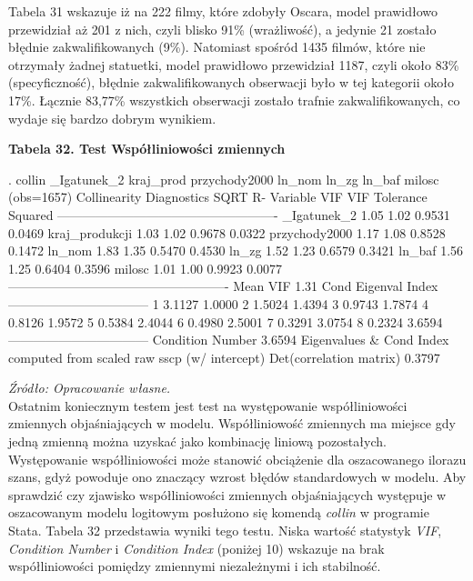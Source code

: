 Tabela 31 wskazuje iż na 222 filmy, które zdobyły Oscara, model prawidłowo przewidział aż 201 z nich, czyli blisko 91\% (wrażliwość), a jedynie 21 zostało błędnie zakwalifikowanych (9\%). Natomiast spośród 1435 filmów, które nie otrzymały żadnej statuetki, model prawidłowo przewidział 1187, czyli około 83\% (specyficzność), błędnie zakwalifikowanych obserwacji było w tej kategorii około 17\%. Łącznie 83,77\% wszystkich obserwacji zostało trafnie zakwalifikowanych, co wydaje się bardzo dobrym wynikiem. 

\vspace{0.5cm}
\textbf{Tabela 32. Test Współliniowości zmiennych }
\begin{stlog}
. collin _Igatunek_2 kraj_prod przychody2000 ln_nom ln_zg ln_baf milosc
(obs=1657)
{\smallskip}
  Collinearity Diagnostics
{\smallskip}
                        SQRT                   R-
  Variable      VIF     VIF    Tolerance    Squared
----------------------------------------------------
_Igatunek_2      1.05    1.02    0.9531      0.0469
kraj_produkcji      1.03    1.02    0.9678      0.0322
przychody2000      1.17    1.08    0.8528      0.1472
    ln_nom      1.83    1.35    0.5470      0.4530
     ln_zg      1.52    1.23    0.6579      0.3421
    ln_baf      1.56    1.25    0.6404      0.3596
    milosc      1.01    1.00    0.9923      0.0077
----------------------------------------------------
  Mean VIF      1.31
{\smallskip}
                           Cond
        Eigenval          Index
---------------------------------
    1     3.1127          1.0000
    2     1.5024          1.4394
    3     0.9743          1.7874
    4     0.8126          1.9572
    5     0.5384          2.4044
    6     0.4980          2.5001
    7     0.3291          3.0754
    8     0.2324          3.6594
---------------------------------
 Condition Number         3.6594 
 Eigenvalues \& Cond Index computed from scaled raw sscp (w/ intercept)
 Det(correlation matrix)    0.3797
\end{stlog}

\textit{\footnotesize{Źródło: Opracowanie własne.}} \\

Ostatnim koniecznym testem jest test na występowanie współliniowości zmiennych objaśniających w modelu. Współliniowość zmiennych ma miejsce gdy jedną zmienną można uzyskać jako kombinację liniową pozostałych. Występowanie współliniowości może stanowić obciążenie dla oszacowanego ilorazu szans, gdyż powoduje ono znaczący wzrost błędów standardowych w modelu. Aby sprawdzić czy zjawisko współliniowości zmiennych objaśniających występuje w oszacowanym modelu logitowym posłużono się komendą \textit{collin} w programie Stata. Tabela 32 przedstawia wyniki tego testu. Niska wartość statystyk \textit{VIF}, \textit{Condition Number} i \textit{Condition Index} (poniżej 10) wskazuje na brak współliniowości pomiędzy zmiennymi niezależnymi i ich stabilność.

